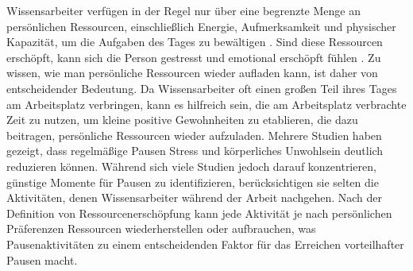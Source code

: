 \documentclass{hasel_thesis}
\begin{document}
\begin{Zusammenfassung}
Wissensarbeiter verfügen in der Regel nur über eine begrenzte Menge an persönlichen Ressourcen, einschließlich Energie, Aufmerksamkeit und physischer Kapazität, um die Aufgaben des Tages zu bewältigen \cite{BaumeisterR.F.BratslavskyE.MuravenM.&TiceD.M..1998}. Sind diese Ressourcen erschöpft, kann sich die Person gestresst und emotional erschöpft fühlen \cite{Sonnentag.2001, Trougakos.2009}. Zu wissen, wie man persönliche Ressourcen wieder aufladen kann, ist daher von entscheidender Bedeutung. Da Wissensarbeiter oft einen großen Teil ihres Tages am Arbeitsplatz verbringen, kann es hilfreich sein, die am Arbeitsplatz verbrachte Zeit zu nutzen, um kleine positive Gewohnheiten zu etablieren, die dazu beitragen, persönliche Ressourcen wieder aufzuladen. Mehrere Studien \cite{Largo-Wight.2017, KimS.ParkY.&Niu.2017} haben gezeigt, dass regelmäßige Pausen Stress und körperliches Unwohlsein deutlich reduzieren können. Während sich viele Studien jedoch darauf konzentrieren, günstige Momente für Pausen zu identifizieren, berücksichtigen sie selten die Aktivitäten, denen Wissensarbeiter während der Arbeit nachgehen. Nach der Definition von Ressourcenerschöpfung \cite{BaumeisterR.F.BratslavskyE.MuravenM.&TiceD.M..1998} kann jede Aktivität je nach persönlichen Präferenzen Ressourcen wiederherstellen oder aufbrauchen, was Pausenaktivitäten zu einem entscheidenden Faktor für das Erreichen vorteilhafter Pausen macht.


\end{Zusammenfassung}
\end{document}
